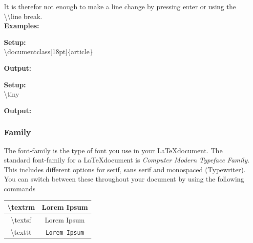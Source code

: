 \documentclass{article}
\newcommand{\bs}[1]{\textbackslash{}#1} %
\begin{document}
It is therefor not enough to make a line change by pressing enter or using the \textbackslash\textbackslash line break. \\

{\large\textbf{Examples:}} \\
\begin{multicols}{2}
\noindent  %
\vspace{0.5em}  %
\textbf{Setup:} \\
\bs{documentclass[18pt]\{article\}}

\vspace{1.5em}  %
\textbf{Output:} \\
\end{multicols} %

\begin{multicols}{2}
\noindent

\vspace{0.5em}
\textbf{Setup:} \\
\bs{tiny}

\vspace{0.5em}
\textbf{Output:} \\
\end{multicols} %


\subsubsection{Family}\label{subsubsec:text_family}
The font-family is the type of font you use in your \LaTeX document. The standard font-family for a \LaTeX document is \textit{Computer Modern Typeface Family}. 
This includes different options for serif, sans serif and monospaced (Typewriter). You can switch between these throughout your document by using the following commands

\begin{table}[H]
    \centering
    \begin{tabular}{|c|c|}
        \hline
        \bs{textrm} & \textrm{Lorem Ipsum} \\ \hline
        \bs{textsf} & \textsf{Lorem Ipsum} \\ \hline
        \bs{texttt} & \texttt{Lorem Ipsum} \\ \hline
    \end{tabular}
    \label{tab:font_family}
\end{table} %
\end{document}
